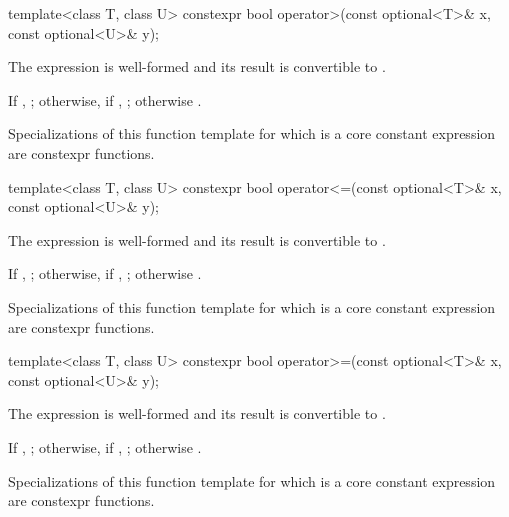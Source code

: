 %
\begin{itemdecl}
template<class T, class U> constexpr bool operator>(const optional<T>& x, const optional<U>& y);
\end{itemdecl}

\begin{itemdescr}
\pnum
\constraints
The expression  is well-formed and
its result is convertible to .

\pnum
\returns
If , ;
otherwise, if , ;
otherwise .

\pnum
\remarks
Specializations of this function template
for which  is a core constant expression
are constexpr functions.
\end{itemdescr}

%
\begin{itemdecl}
template<class T, class U> constexpr bool operator<=(const optional<T>& x, const optional<U>& y);
\end{itemdecl}

\begin{itemdescr}
\pnum
\constraints
The expression  is well-formed and
its result is convertible to .

\pnum
\returns
If , ;
otherwise, if , ;
otherwise .

\pnum
\remarks
Specializations of this function template
for which  is a core constant expression
are constexpr functions.
\end{itemdescr}

%
\begin{itemdecl}
template<class T, class U> constexpr bool operator>=(const optional<T>& x, const optional<U>& y);
\end{itemdecl}

\begin{itemdescr}
\pnum
\constraints
The expression  is well-formed and
its result is convertible to .

\pnum
\returns
If , ;
otherwise, if , ;
otherwise .

\pnum
\remarks
Specializations of this function template
for which  is a core constant expression
are constexpr functions.
\end{itemdescr}

